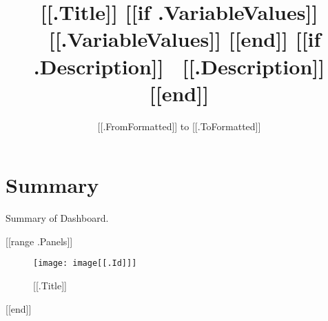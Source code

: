 \documentclass{article}
\begin{document}
\title{[[.Title]] [[if .VariableValues]] \ \large{[[.VariableValues]]} [[end]] [[if .Description]] \ \small{[[.Description]]} [[end]]}
\date{[[.FromFormatted]] to [[.ToFormatted]]}
\maketitle

\section*{Summary}
Summary of Dashboard.

[[range .Panels]] %
\begin{figure}[h]
  \centering
  \texttt{[image: image[[.Id]]]} %
  \caption{[[.Title]]} %
\end{figure}
[[end]] %
\end{document}
